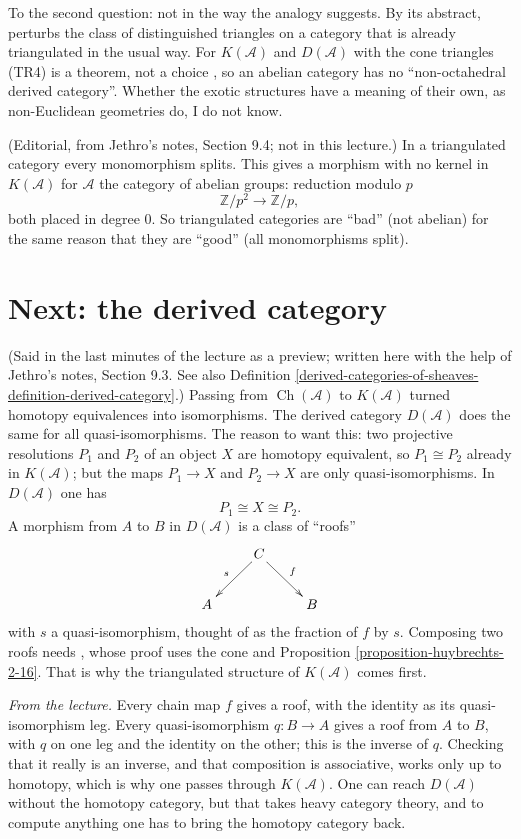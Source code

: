 \medskip\noindent
To the second question: not in the way
the analogy suggests. By its abstract,
\cite{cilsz-tr4} perturbs the class of
distinguished triangles on a category
that is already triangulated in the
usual way. For $K(\mathcal{A})$ and
$D(\mathcal{A})$ with the cone triangles
(TR4) is a theorem, not a choice
\cite[Proposition 2.24]{huybrechts-fm},
so an abelian category has no
``non-octahedral derived category''.
Whether the exotic structures have a
meaning of their own, as non-Euclidean
geometries do, I do not know.

\begin{remark}
\label{remark-homotopy-category-not-abelian}
(Editorial, from Jethro's notes, Section
9.4; not in this lecture.) In a
triangulated category every
monomorphism splits. This gives a
morphism with no kernel in
$K(\mathcal{A})$ for $\mathcal{A}$ the
category of abelian groups: reduction
modulo $p$
$$
\mathbb{Z}/p^2\to\mathbb{Z}/p,
$$
both placed in degree $0$. So
triangulated categories are ``bad''
(not abelian) for the same reason that
they are ``good'' (all monomorphisms
split).
\end{remark}

\section{Next: the derived category}
\label{section-next-derived-category}

\noindent
(Said in the last minutes of the
lecture as a preview; written here with
the help of Jethro's notes, Section 9.3.
See also Definition
\ref{derived-categories-of-sheaves-definition-derived-category}.)
Passing from
$\operatorname{Ch}(\mathcal{A})$ to
$K(\mathcal{A})$ turned homotopy
equivalences into isomorphisms. The
derived category $D(\mathcal{A})$ does
the same for all quasi-isomorphisms. The
reason to want this: two projective
resolutions $P_1$ and $P_2$ of an object
$X$ are homotopy equivalent, so
$P_1\cong P_2$ already in
$K(\mathcal{A})$; but the maps
$P_1\to X$ and $P_2\to X$ are only
quasi-isomorphisms. In $D(\mathcal{A})$
one has
$$
P_1\cong X\cong P_2.
$$
A morphism from $A$ to $B$ in
$D(\mathcal{A})$ is a class of ``roofs''
$$
\xymatrix{
&C\ar[dl]_{s}\ar[dr]^{f}&\\
A&&B
}
$$
with $s$ a quasi-isomorphism, thought of
as the fraction of $f$ by $s$. Composing
two roofs needs
\cite[Proposition 2.17]{huybrechts-fm},
whose proof uses the cone and
Proposition
\ref{proposition-huybrechts-2-16}. That
is why the triangulated structure of
$K(\mathcal{A})$ comes first.

\medskip\noindent
{\it From the lecture.} Every chain map $f$ gives
a roof, with the identity as its
quasi-isomorphism leg. Every
quasi-isomorphism $q:B\to A$ gives a roof
from $A$ to $B$, with $q$ on one leg and
the identity on the other; this is the
inverse of $q$. Checking that it really
is an inverse, and that composition is
associative, works only up to homotopy,
which is why one passes through
$K(\mathcal{A})$. One can reach
$D(\mathcal{A})$ without the homotopy
category, but that takes heavy category
theory, and to compute anything one has
to bring the homotopy category back.





